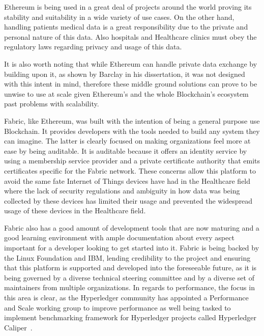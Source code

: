 Ethereum is being used in a great deal of projects around the world proving its
stability and suitability in a wide variety of use cases. On the other hand,
handling patients medical data is a great responsibility due to the private and
personal nature of this data. Also hospitals and Healthcare clinics must obey
the regulatory laws regarding privacy and usage of this data.

It is also worth noting that while Ethereum can handle private data exchange by
building upon it, as shown by Barclay in his dissertation, it was not designed
with this intent in mind, therefore these middle ground solutions can prove to
be unwise to use at scale given Ethereum's and the whole Blockchain's ecosystem
past problems with scalability.  

Fabric, like Ethereum, was built with the intention of being a general purpose
use Blockchain. It provides developers with the tools needed to build any
system they can imagine. The latter is clearly focused on making organizations
feel more at ease by being auditable. It is auditable because it offers an
identity service by using a membership service provider and a private
certificate authority that emits certificates specific for the Fabric network.
These concerns allow this platform to avoid the same fate Internet of Things
devices have had in the Healthcare field~\cite{Tana2017} where the lack of
security regulations and ambiguity in how data was being collected by these
devices has limited their usage and prevented the widespread usage of these
devices in the Healthcare field.

Fabric also has a good amount of development tools that are now maturing and a
good learning environment with ample documentation about every aspect important
for a developer looking to get started into it. Fabric is being backed by the
Linux Foundation and IBM, lending credibility to the project and ensuring that
this platform is supported and developed into the foreseeable future, as it is
being governed by a diverse technical steering committee and by a diverse set
of maintainers from multiple organizations. In regards to performance, the
focus in this area is clear, as the Hyperledger community has appointed a
Performance and Scale working group to improve performance as well being tasked
to implement benchmarking framework for Hyperledger projects called Hyperledger
Caliper~\cite{performanceScale2017}.

